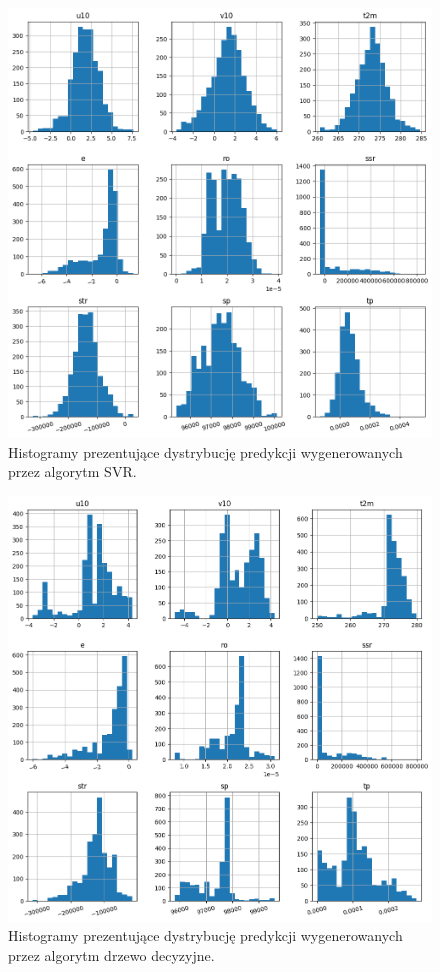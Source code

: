 \begin{figure}[H]
    \centering
    \includegraphics[width=\textwidth]{images/svr_hist.png}
    \caption{Histogramy prezentujące dystrybucję predykcji wygenerowanych przez algorytm SVR.}
    \label{svr-hist}
\end{figure}

\begin{figure}[H]
    \centering
    \includegraphics[width=\textwidth]{images/dt_hist.png}
    \caption{Histogramy prezentujące dystrybucję predykcji wygenerowanych przez algorytm drzewo decyzyjne.}
    \label{dt-hist}
\end{figure}

